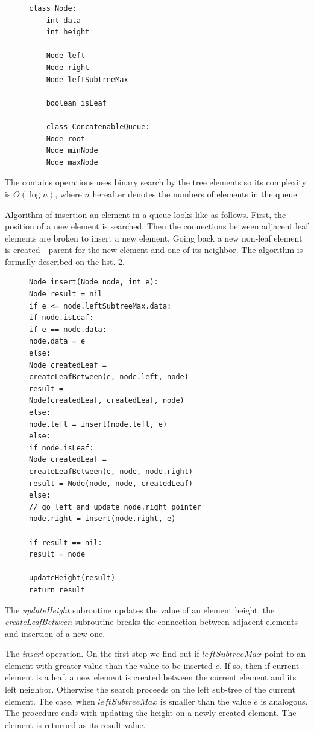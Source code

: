 \documentclass[conference]{IEEEtran}
\theoremstyle{plane}
\begin{document}
\begin{figure}[htbp]
	\begin{lstlisting}[caption={Structure of a concatenable queue vertex},captionpos=b]
	class Node:
	int data		
	int height
	
	Node left
	Node right
	Node leftSubtreeMax
	
	boolean isLeaf
	
	class ConcatenableQueue:
	Node root
	Node minNode
	Node maxNode
	\end{lstlisting}
\end{figure}

The contains operations uses binary search by the tree elements so its complexity is $O(\log n)$, where $n$ hereafter denotes the numbers of elements in the queue.

Algorithm of insertion an element in a queue looks like as follows. First, the position of a new element is searched. Then the connections between adjacent leaf elements are broken to insert a new element. Going back a new non-leaf element is created - parent for the new element and one of its neighbor. The algorithm is formally described on the list. 2.

\begin{figure}[htbp]
\begin{lstlisting}[caption={Queue element insertion algorithm},captionpos=b]
Node insert(Node node, int e):
Node result = nil
if e <= node.leftSubtreeMax.data: 
if node.isLeaf:
if e == node.data:
node.data = e
else:
Node createdLeaf = 
createLeafBetween(e, node.left, node)
result = 
Node(createdLeaf, createdLeaf, node)
else:
node.left = insert(node.left, e)
else:
if node.isLeaf: 
Node createdLeaf = 
createLeafBetween(e, node, node.right)
result = Node(node, node, createdLeaf)
else: 
// go left and update node.right pointer
node.right = insert(node.right, e)

if result == nil:
result = node

updateHeight(result)
return result
\end{lstlisting}
\end{figure}
	
The \textit{updateHeight} subroutine updates the value of an element height, the \textit{createLeafBetween} subroutine breaks the connection between adjacent elements and insertion of a new one. 

The \textit{insert} operation. On the first step we find out if $leftSubtreeMax$ point to an element with greater value than the value to be inserted $e$. If so, then if current element is a leaf, a new element is created between the current element and its left neighbor. Otherwise the search proceeds on the left sub-tree of the current element. The case, when $leftSubtreeMax$ is smaller than the value $e$ is analogous. The procedure ends with updating the height on a newly created element. The element is returned as its result value.
\end{document}
